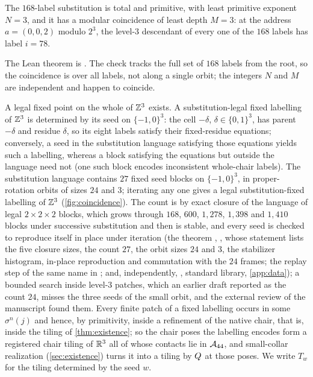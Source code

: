 \begin{theorem}\label{thm:coincidence}
The $168$-label substitution is total and primitive, with least primitive exponent $N=3$, and it
has a modular coincidence of least depth $M=3$: at the address $a=(0,0,2)$ modulo $2^3$, the
level-$3$ descendant of every one of the $168$ labels has label $i=78$.
\end{theorem}

The Lean theorem is . The check tracks the full set of
$168$ labels from the root, so the coincidence is over all labels, not along a single orbit; the integers $N$ and $M$ are independent and happen to
coincide.

A legal fixed point on the whole of $\mathbb{Z}^3$ exists. A substitution-legal fixed labelling of
$\mathbb{Z}^3$ is determined by its seed on $\{-1,0\}^3$: the cell $-\delta$, $\delta\in\{0,1\}^3$, has
parent $-\delta$ and residue $\delta$, so its eight labels satisfy their fixed-residue equations;
conversely, a seed in the substitution language satisfying those equations yields such a
labelling, whereas a block satisfying the equations but outside the language need not (one such
block encodes inconsistent whole-chair labels). The substitution language
contains $27$ fixed seed blocks on $\{-1,0\}^3$, in proper-rotation orbits of sizes $24$ and $3$;
iterating any one gives a legal substitution-fixed labelling of $\mathbb{Z}^3$ (\cref{fig:coincidence}).
The count is by exact closure of the language of legal $2\times2\times2$ blocks, which grows
through $168$, $600$, $1{,}278$, $1{,}398$ and $1{,}410$ blocks under successive substitution and
then is stable, and every seed is checked to reproduce itself in place under iteration (the
theorem , , whose statement lists the five closure sizes,
the count $27$, the orbit sizes $24$ and $3$, the stabilizer histogram, in-place reproduction and
commutation with the $24$ frames; the replay step of the same name in ;
and, independently, , standard library,
\cref{app:data}); a bounded
search inside level-$3$ patches, which an earlier draft reported as the count $24$, misses the
three seeds of the small orbit, and the external review of the manuscript found them. Every
finite patch of a fixed labelling occurs in some $\sigma^n(j)$ and hence, by primitivity, inside
a refinement of the native chair, that is, inside the tiling of \cref{thm:existence}; so the
chair poses the labelling encodes form a registered chair tiling of $\mathbb{R}^3$ all of whose contacts
lie in $\mathcal{A}_{44}$, and small-collar realization (\cref{sec:existence}) turns it into a tiling by
$Q$ at those poses. We write $T_w$ for the tiling determined by the seed $w$.


